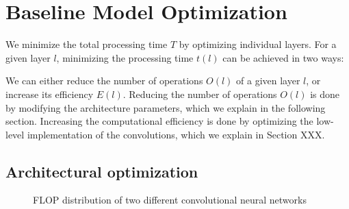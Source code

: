 \documentclass[runningheads]{llncs}
\begin{document}
\section{Baseline Model Optimization}



We minimize the total processing time $T$ by optimizing individual layers.
For a given layer $l$, minimizing the processing time $ t(l) $ can be achieved in two ways:

We can either reduce the number of operations $O(l)$ of a given layer $l$, or increase its efficiency $E(l)$.
Reducing the number of operations $O(l)$ is done by modifying the architecture parameters, which we explain in the following section.
Increasing the computational efficiency is done by optimizing the low-level implementation of the convolutions, which we explain in Section XXX.



\subsection{Architectural optimization}

\begin{figure}[h]
\centering
{}%
%

\centering
\caption{FLOP distribution of two different convolutional neural networks}
\end{figure}
\end{document}
